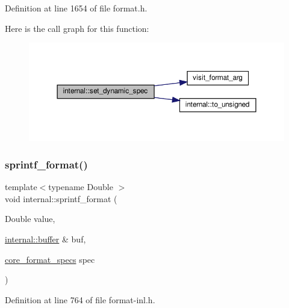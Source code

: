Definition at line 1654 of file format.\+h.

Here is the call graph for this function\+:
\nopagebreak
\begin{figure}[H]
\begin{center}
\leavevmode
\includegraphics[width=350pt]{namespaceinternal_aa85eeb6162dd6a5dcc6b8416d9bba83c_cgraph}
\end{center}
\end{figure}
\mbox{\label{namespaceinternal_a13d861df4fe01615dc7cb28d77e839e4}} 
\subsubsection{\texorpdfstring{sprintf\+\_\+format()}{sprintf\_format()}}
{\footnotesize\ttfamily template$<$typename Double $>$ \\
void internal\+::sprintf\+\_\+format (\begin{DoxyParamCaption}\item[{Double}]{value,  }\item[{\hyperlink{namespaceinternal_a5fcdbc3efad1f390e6c3f0fdafa56122}{internal\+::buffer} \&}]{buf,  }\item[{\hyperlink{structcore__format__specs}{core\+\_\+format\+\_\+specs}}]{spec }\end{DoxyParamCaption})}



Definition at line 764 of file format-\/inl.\+h.

